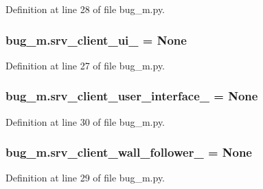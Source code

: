 Definition at line 28 of file bug\+\_\+m.\+py.

\subsubsection[{\texorpdfstring{srv\+\_\+client\+\_\+ui\+\_\+}{srv_client_ui_}}]{\setlength{\rightskip}{0pt plus 5cm}bug\+\_\+m.\+srv\+\_\+client\+\_\+ui\+\_\+ = None}\hypertarget{namespacebug__m_adc5006acf60c13dce69dfffa2e1d0e2a}{}\label{namespacebug__m_adc5006acf60c13dce69dfffa2e1d0e2a}


Definition at line 27 of file bug\+\_\+m.\+py.

\subsubsection[{\texorpdfstring{srv\+\_\+client\+\_\+user\+\_\+interface\+\_\+}{srv_client_user_interface_}}]{\setlength{\rightskip}{0pt plus 5cm}bug\+\_\+m.\+srv\+\_\+client\+\_\+user\+\_\+interface\+\_\+ = None}\hypertarget{namespacebug__m_ac6217733c79e361a3bf86e4f51b6ecfd}{}\label{namespacebug__m_ac6217733c79e361a3bf86e4f51b6ecfd}


Definition at line 30 of file bug\+\_\+m.\+py.

\subsubsection[{\texorpdfstring{srv\+\_\+client\+\_\+wall\+\_\+follower\+\_\+}{srv_client_wall_follower_}}]{\setlength{\rightskip}{0pt plus 5cm}bug\+\_\+m.\+srv\+\_\+client\+\_\+wall\+\_\+follower\+\_\+ = None}\hypertarget{namespacebug__m_af40e8063430e5b54ef2f3f8368338744}{}\label{namespacebug__m_af40e8063430e5b54ef2f3f8368338744}


Definition at line 29 of file bug\+\_\+m.\+py.

